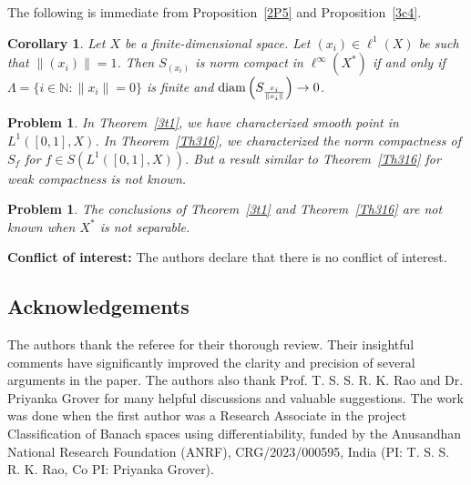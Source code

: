 \documentclass[12pt]{amsart}
\newtheorem{corollary}[theorem]{Corollary}
\newtheorem{problem}[theorem]{Problem}
\theoremstyle{definition}
\numberwithin{equation}{section}
\begin{document}
The following is immediate from Proposition~\ref{2P5} and Proposition~\ref{3c4}.
\begin{corollary}
    Let $X$ be a finite-dimensional space. Let $(x_i) \in \ell^{1}(X) $ be such that $ \| (x_i) \| = 1 $. Then $ S_{(x_i)}$ is norm compact in $ \ell^\infty(X^*) $ if and only if  $\Lambda=\{i\in\mathbb{N}:\|x_{i}\|=0\}$ is finite and $ \textup{diam}\left(S_{\frac{x_i}{\|x_i\|}}\right) \to 0 $.
\end{corollary}
\begin{problem}
In Theorem~\ref{3t1}, we have characterized smooth point in $L^{1}([0,1],X)$. In Theorem~\ref{Th316}, we characterized the norm compactness of $S_f$ for $f\in S(L^{1}([0,1],X))$. But a result similar to Theorem~\ref{Th316} for weak compactness is not known.
\end{problem}
\begin{problem}
    The conclusions of Theorem~\ref{3t1} and Theorem~\ref{Th316} are not known when $X^*$ is not separable.
\end{problem}
\vspace{2mm}
\noindent\small{\bf Conflict of interest:} The authors declare that there is no conflict of interest.


\subsection*{Acknowledgements}
The authors thank the referee for their thorough review. Their insightful comments have significantly improved the clarity and precision of several arguments in the paper. The authors also thank Prof. T. S. S. R. K. Rao and Dr. Priyanka Grover for many helpful discussions and valuable suggestions. The work was done when the first author was a Research Associate in the project Classification of Banach spaces using differentiability, funded by the Anusandhan National Research Foundation (ANRF), CRG/2023/000595, India (PI: T. S. S. R. K. Rao, Co PI: Priyanka Grover).



\normalsize
\end{document}
